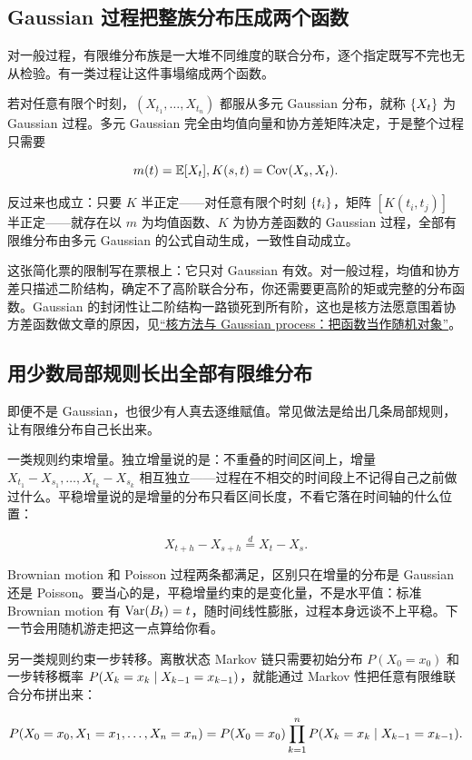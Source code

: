 \subsection{Gaussian 过程把整族分布压成两个函数}

对一般过程，有限维分布族是一大堆不同维度的联合分布，逐个指定既写不完也无从检验。有一类过程让这件事塌缩成两个函数。

若对任意有限个时刻，\((X_{t_1},\ldots,X_{t_n})\) 都服从多元 Gaussian 分布，就称 \(\left\{X_t\right\}\) 为 Gaussian 过程。多元 Gaussian 完全由均值向量和协方差矩阵决定，于是整个过程只需要

\[
m(t) = \mathbb{E}[X_t],\space K(s,t) = \operatorname{Cov}(X_s, X_t).
\]

反过来也成立：只要 \(K\) 半正定——对任意有限个时刻 \(\left\{t_i\right\}\)，矩阵 \([K(t_i,t_j)]\) 半正定——就存在以 \(m\) 为均值函数、\(K\) 为协方差函数的 Gaussian 过程，全部有限维分布由多元 Gaussian 的公式自动生成，一致性自动成立。

这张简化票的限制写在票根上：它只对 Gaussian 有效。对一般过程，均值和协方差只描述二阶结构，确定不了高阶联合分布，你还需要更高阶的矩或完整的分布函数。Gaussian 的封闭性让二阶结构一路锁死到所有阶，这也是核方法愿意围着协方差函数做文章的原因，见\hyperref[ch:117]{``核方法与 Gaussian process：把函数当作随机对象''}。

\subsection{用少数局部规则长出全部有限维分布}

即便不是 Gaussian，也很少有人真去逐维赋值。常见做法是给出几条局部规则，让有限维分布自己长出来。

一类规则约束增量。独立增量说的是：不重叠的时间区间上，增量 \(X_{t_1}-X_{s_1},\ldots,X_{t_k}-X_{s_k}\) 相互独立——过程在不相交的时间段上不记得自己之前做过什么。平稳增量说的是增量的分布只看区间长度，不看它落在时间轴的什么位置：

\[
X_{t+h} - X_{s+h} \overset{d}{=} X_t - X_s.
\]

Brownian motion 和 Poisson 过程两条都满足，区别只在增量的分布是 Gaussian 还是 Poisson。要当心的是，平稳增量约束的是变化量，不是水平值：标准 Brownian motion 有 \(\operatorname{Var}(B_t)=t\)，随时间线性膨胀，过程本身远谈不上平稳。下一节会用随机游走把这一点算给你看。

另一类规则约束一步转移。离散状态 Markov 链只需要初始分布 \(P(X_0=x_0)\) 和一步转移概率 \(P(X_k=x_k \mid X_{k-1}=x_{k-1})\)，就能通过 Markov 性把任意有限维联合分布拼出来：

\[
P(X_0=x_0, X_1=x_1, \ldots, X_n=x_n)
= P(X_0=x_0) \prod_{k=1}^{n} P(X_k=x_k \mid X_{k-1}=x_{k-1}).
\]

